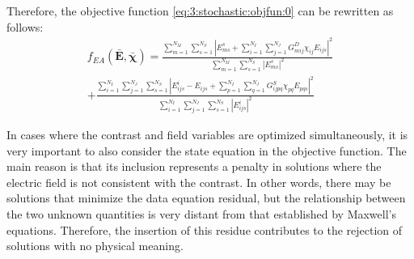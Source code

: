 			Therefore, the objective function \eqref{eq:3:stochastic:objfun:0} can be rewritten as follows:
			\begin{multline}
				f_{EA}(\mathbf{\bar{E}},\boldsymbol{\bar{\chi}}) = \frac{\sum\limits_{m=1}^{N_M}\sum\limits_{s=1}^{N_S} \left|E^s_{ms} + \sum\limits_{i=1}^{N_I}\sum\limits_{j=1}^{N_J} G^D_{mij}\chi_{ij}E_{ijs}\right|^2}{\sum\limits_{m=1}^{N_M}\sum\limits_{s=1}^{N_S} \left|E^s_{ms}\right|^2} \\ + \frac{\sum\limits_{i=1}^{N_I}\sum\limits_{j=1}^{N_J}\sum\limits_{s=1}^{N_S}\left|E^i_{ijs}-E_{ijs} + \sum\limits_{p=1}^{N_I}\sum\limits_{q=1}^{N_J}G^S_{ijpq}\chi_{pq}E_{pqs}\right|^2}{\sum\limits_{i=1}^{N_I}\sum\limits_{j=1}^{N_J}\sum\limits_{s=1}^{N_S} \left|E^i_{ijs}\right|^2} \label{eq:3:stochastic:objfun:traditional}
			\end{multline}
		
			In cases where the contrast and field variables are optimized simultaneously, it is very important to also consider the state equation in the objective function. The main reason is that its inclusion represents a penalty in solutions where the electric field is not consistent with the contrast. In other words, there may be solutions that minimize the data equation residual, but the relationship between the two unknown quantities is very distant from that established by Maxwell's equations. Therefore, the insertion of this residue contributes to the rejection of solutions with no physical meaning.
			

